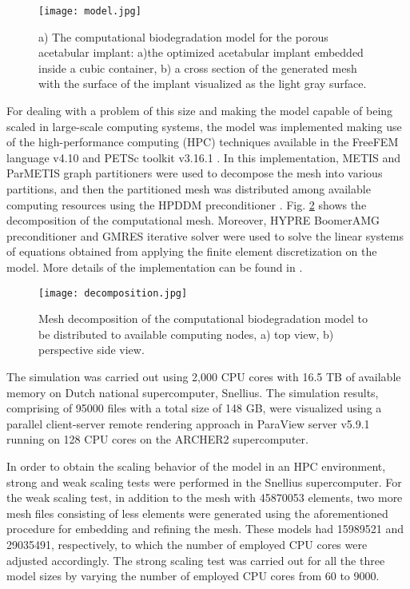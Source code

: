 \begin{figure}[h]
\centering
\medskip
\texttt{[image: model.jpg]}
\caption[Computational biodegradation model for the porous acetabular implant]{a) The computational biodegradation model for the porous acetabular implant: a)the optimized acetabular implant embedded inside a cubic container, b) a cross section of the generated mesh with the surface of the implant visualized as the light gray surface.} \label{fig:cup_model}
\end{figure}

For dealing with a problem of this size and making the model capable of being scaled in large-scale computing systems, the model was implemented making use of the high-performance computing (HPC) techniques available in the FreeFEM language v4.10 and PETSc toolkit v3.16.1 \cite{petsc}. In this implementation, METIS and ParMETIS graph partitioners \cite{METIS1998} were used to decompose the mesh into various partitions, and then the partitioned mesh was distributed among available computing resources using the HPDDM preconditioner \cite{Jolivet2013}. Fig. \ref{fig:cup_decomposition} shows the decomposition of the computational mesh. Moreover, HYPRE BoomerAMG \cite{Falgout2002} preconditioner and GMRES iterative solver \cite{Saad1986} were used to solve the linear systems of equations obtained from applying the finite element discretization on the model. More details of the implementation can be found in \cite{Barzegari2022}.

\begin{figure}[h]
\centering
\medskip
\texttt{[image: decomposition.jpg]}
\caption[Mesh decomposition of the acetabular implant model]{Mesh decomposition of the computational biodegradation model to be distributed to available computing nodes, a) top view, b) perspective side view. } \label{fig:cup_decomposition}
\end{figure}

The simulation was carried out using 2,000 CPU cores with 16.5 TB of available memory on Dutch national supercomputer, Snellius. The simulation results, comprising of \num{95000} files with a total size of 148 GB, were visualized using a parallel client-server remote rendering approach in ParaView server v5.9.1 running on 128 CPU cores on the ARCHER2 supercomputer. 

In order to obtain the scaling behavior of the model in an HPC environment, strong and weak scaling tests were performed in the Snellius supercomputer. For the weak scaling test, in addition to the mesh with \num{45870053} elements, two more mesh files consisting of less elements were generated using the aforementioned procedure for embedding and refining the mesh. These models had \num{15989521} and \num{29035491}, respectively, to which the number of employed CPU cores were adjusted accordingly. The strong scaling test was carried out for all the three model sizes by varying the number of employed CPU cores from 60 to \num{9000}. 


